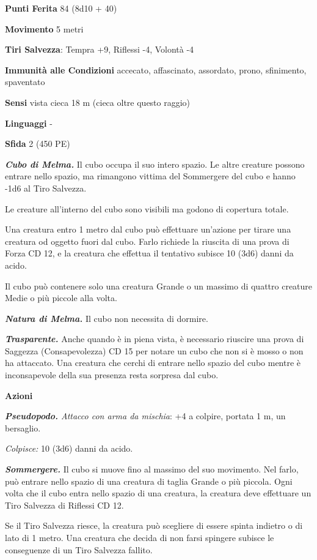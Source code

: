 \begin{multicols}{2}
\textbf{Punti Ferita} 84 (8d10 + 40)

\textbf{Movimento} 5 metri

\textbf{Tiri Salvezza}: Tempra +9, Riflessi -4, Volontà -4

\textbf{Immunità alle Condizioni} accecato, affascinato, assordato, prono, sfinimento, spaventato

\textbf{Sensi} vista cieca 18 m (cieca oltre questo raggio)

\textbf{Linguaggi} -

\textbf{Sfida} 2 (450 PE)

\emph{\textbf{Cubo di Melma.}} Il cubo occupa il suo intero spazio. Le
altre creature possono entrare nello spazio, ma rimangono vittima del
Sommergere del cubo e hanno -1d6 al Tiro Salvezza.

Le creature all'interno del cubo sono visibili ma godono di copertura
totale.

Una creatura entro 1 metro dal cubo può effettuare un'azione per tirare una creatura od oggetto fuori dal cubo. Farlo richiede la riuscita di una prova di Forza CD 12, e la creatura che effettua il tentativo subisce 10 (3d6) danni da acido.

Il cubo può contenere solo una creatura Grande o un massimo di quattro
creature Medie o più piccole alla volta.

\emph{\textbf{Natura di Melma.}} Il cubo non necessita di dormire.

\emph{\textbf{Trasparente.}} Anche quando è in piena vista, è necessario riuscire una prova di Saggezza (Consapevolezza) CD 15 per notare un cubo che non si è mosso o non ha attaccato. Una creatura che cerchi di entrare nello spazio del cubo mentre è inconsapevole della sua presenza resta sorpresa dal cubo.

\textbf{Azioni}

\emph{\textbf{Pseudopodo.} Attacco con arma da mischia}: +4 a colpire,
portata 1 m, un bersaglio.

\emph{Colpisce:} 10 (3d6) danni da acido.

\emph{\textbf{Sommergere.}} Il cubo si muove fino al massimo del suo movimento. Nel farlo, può entrare nello spazio di una creatura di taglia Grande o più piccola. Ogni volta che il cubo entra nello spazio di una creatura, la creatura deve effettuare un Tiro Salvezza di Riflessi CD 12.

Se il Tiro Salvezza riesce, la creatura può scegliere di essere spinta indietro o di lato di 1 metro. Una creatura che decida di non farsi spingere subisce le conseguenze di un Tiro Salvezza fallito.


\end{multicols}
